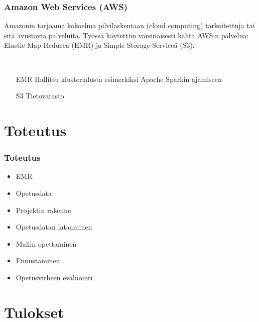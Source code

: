 \documentclass{beamer}
\begin{document}
\begin{frame}
\frametitle{Amazon Web Services (AWS)}

Amazonin tarjoama kokoelma pilvilaskentaan (cloud computing) tarkoitettuja tai sitä avustavia palveluita.
Työssä käytettiin varsinaisesti kahta AWS:n palvelua: Elastic Map Reducea (EMR) ja Simple Storage Serviceä (S3).

~

\begin{itemize}
	\item [EMR] Hallittu klusterialusta esimerkiksi Apache Sparkin ajamiseen
	\item [S3] Tietovarasto
\end{itemize}

\end{frame}


\section{Toteutus}

\begin{frame}
\frametitle{Toteutus}

\begin{itemize}
	\item EMR
	\item Opetusdata
	\item Projektin rakenne
	\item Opetusdatan lataaminen
	\item Mallin opettaminen
	\item Ennustaminen
	\item Opetusvirheen evaluointi
\end{itemize}

\end{frame}


\section{Tulokset}
\end{document}
